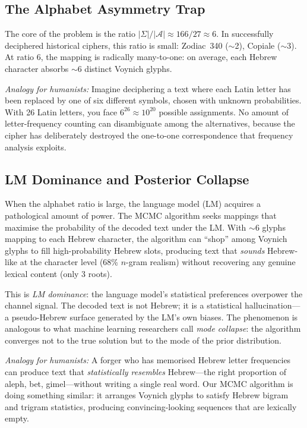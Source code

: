 \documentclass[11pt,a4paper]{article}
\begin{document}
\subsection{The Alphabet Asymmetry Trap}

The core of the problem is the ratio $|\Sigma|/|\mathcal{A}| \approx 166/27 \approx 6$.  In successfully deciphered historical ciphers, this ratio is small: Zodiac~340 ($\sim$2), Copiale ($\sim$3).  At ratio 6, the mapping is radically many-to-one: on average, each Hebrew character absorbs $\sim$6 distinct Voynich glyphs.

\textit{Analogy for humanists:} Imagine deciphering a text where each Latin letter has been replaced by one of six different symbols, chosen with unknown probabilities.  With 26 Latin letters, you face $6^{26} \approx 10^{20}$ possible assignments.  No amount of letter-frequency counting can disambiguate among the alternatives, because the cipher has deliberately destroyed the one-to-one correspondence that frequency analysis exploits.

\subsection{LM Dominance and Posterior Collapse}

When the alphabet ratio is large, the language model (LM) acquires a pathological amount of power.  The MCMC algorithm seeks mappings that maximise the probability of the decoded text under the LM.  With $\sim$6 glyphs mapping to each Hebrew character, the algorithm can ``shop'' among Voynich glyphs to fill high-probability Hebrew slots, producing text that \emph{sounds} Hebrew-like at the character level (68\% $n$-gram realism) without recovering any genuine lexical content (only 3 roots).

This is \emph{LM dominance}: the language model's statistical preferences overpower the channel signal.  The decoded text is not Hebrew; it is a statistical hallucination---a pseudo-Hebrew surface generated by the LM's own biases.  The phenomenon is analogous to what machine learning researchers call \emph{mode collapse}: the algorithm converges not to the true solution but to the mode of the prior distribution.

\textit{Analogy for humanists:} A forger who has memorised Hebrew letter frequencies can produce text that \emph{statistically resembles} Hebrew---the right proportion of aleph, bet, gimel---without writing a single real word.  Our MCMC algorithm is doing something similar: it arranges Voynich glyphs to satisfy Hebrew bigram and trigram statistics, producing convincing-looking sequences that are lexically empty.
\end{document}
